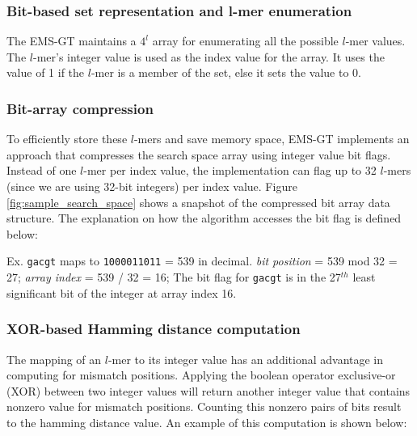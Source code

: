 	\subsubsection{Bit-based set representation and l-mer enumeration} 
	The EMS-GT maintains a $4^l$ array for enumerating all the possible $l$-mer values. The $l$-mer's integer value is used as the index value for the array. It uses the value of 1 if the $l$-mer is a member of the set, else it sets the value to 0.

	\subsubsection{Bit-array compression}
	To efficiently store these $l$-mers and save memory space, EMS-GT implements an approach that compresses the search space array using integer value bit flags. Instead of one $l$-mer per index value, the implementation can flag up to 32 $l$-mers (since we are using 32-bit integers) per index value. Figure \ref{fig:sample_search_space} shows a snapshot of the compressed bit array data structure. The explanation on how the algorithm accesses the bit flag is defined below: \newline

		{\small Ex. \texttt{gacgt} maps to \texttt{1000011011} = 539 in decimal.\newline
			\hspace*{64pt} \emph{bit position} = 539 mod 32 = 27;\newline
			\hspace*{64pt} \emph{array index}  = 539 / 32 = 16;\newline
			\hspace*{64pt} The bit flag for \texttt{gacgt} is in the 27$^{th}$ least significant bit\newline
			\hspace*{64pt} of the integer at array index 16.}

	

	\subsubsection{XOR-based Hamming distance computation}
	The mapping of an $l$-mer to its integer value has an additional advantage in computing for mismatch positions. Applying the boolean operator exclusive-or (XOR) between two integer values will return another integer value that contains nonzero value for mismatch positions. Counting this nonzero pairs of bits result to the hamming distance value. An example of this computation is shown below: \newline


